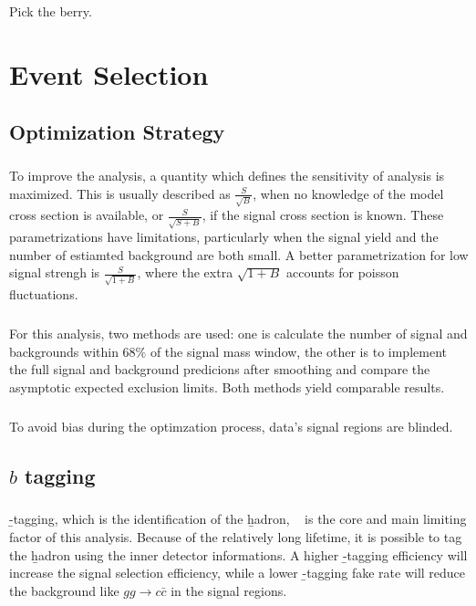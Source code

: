 \begin{savequote}[75mm]
Pick the berry.
\end{savequote}

\chapter{Event Selection}


\section{Optimization Strategy}

\paragraph{}
To improve the analysis, a quantity which defines the sensitivity of analysis is maximized. This is usually described as $\frac{S}{\sqrt{B}}$, when no knowledge of the model cross section is available, or $\frac{S}{\sqrt{S + B}}$, if the signal cross section is known. These parametrizations have limitations, particularly when the signal yield and the number of estiamted background are both small. A better parametrization for low signal strengh is $\frac{S}{\sqrt{1 + B}}$, where the extra $\sqrt{1 + B}$ accounts for poisson fluctuations.

\paragraph{}
For this analysis, two methods are used: one is calculate the number of signal and backgrounds within $68\%$ of the signal \mhh mass window, the other is to implement the full signal and background predicions after smoothing and compare the asymptotic expected exclusion limits. Both methods yield comparable results.

\paragraph{}
To avoid bias during the optimzation process, data's signal regions are blinded.


\section{$b$ tagging}
\paragraph{}
\b-tagging, which is the identification of the \b hadron,  ~\cite{Reco-btag-2016} is the core and main limiting factor of this analysis. Because of the relatively long lifetime, it is possible to tag the \b hadron using the inner detector informations. A higher \b-tagging efficiency will increase the signal selection efficiency, while a lower \b-tagging fake rate will reduce the background like $gg \to c\bar{c}$ in the signal regions.


